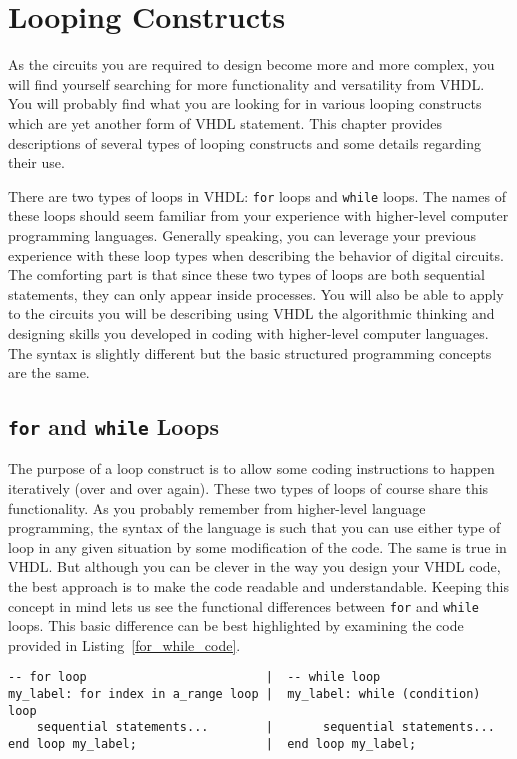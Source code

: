 %
%
\chapter{Looping Constructs}
As the circuits you are required to design become more and more complex, you will find yourself searching for more functionality and versatility from VHDL. You will probably find what you are looking for in various looping constructs which are yet another form of VHDL statement. This chapter provides descriptions of several types of looping constructs and some details regarding their use.

There are two types of loops in VHDL: \texttt{for} loops and \texttt{while} loops. The names of these loops should seem familiar from your experience with higher-level computer programming languages. Generally speaking, you can leverage your previous experience with these loop types when describing the behavior of digital circuits. The comforting part is that since these two types of loops are both sequential statements, they can only appear inside processes. You will also be able to apply to the circuits you will be describing using VHDL the algorithmic thinking and designing skills you developed in coding with higher-level computer languages. The syntax is slightly different but the basic structured programming concepts are the same.

\section{\texttt{for} and \texttt{while} Loops}
The purpose of a loop construct is to allow some coding instructions to happen iteratively (over and over again). These two types of loops of course share this functionality. As you probably remember from higher-level language programming, the syntax of the language is such that you can use either type of loop in any given situation by some modification of the code. The same is true in VHDL. But although you can be clever in the way you design your VHDL code, the best approach is to make the code readable and understandable. Keeping this concept in mind lets us see the functional differences between \texttt{for} and \texttt{while} loops. This basic difference can be best highlighted by examining the code provided in Listing~\ref{for_while_code}.

\noindent
\begin{minipage}{0.99\linewidth}
\begin{lstlisting}[label=for_while_code, caption=The basic structure of the \texttt{for} and \texttt{while} loops.]
-- for loop							|  -- while loop
my_label: for index in a_range loop	|  my_label: while (condition) loop
	sequential statements...		|       sequential statements...
end loop my_label;					|  end loop my_label;
\end{lstlisting}
\end{minipage}

